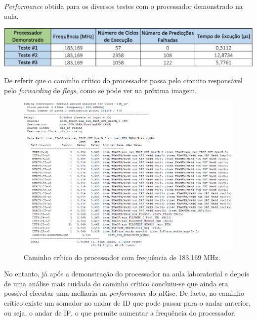 \documentclass[11pt]{article}
\numberwithin{equation}{section}
\begin{document}
\begin{table}[H]
	\centering
	\caption{\textit{Performance} obtida para os diversos testes com o processador demonstrado na aula.}
	\vspace{-1.5mm}
	\includegraphics[keepaspectratio=true, scale=0.40]{tabelas/processadororiginal}
	\label{tab:processadororiginal}
\end{table}

De referir que o caminho crítico do processador passa pelo circuito responsável pelo \textit{forwarding} de \textit{flags}, como se pode ver na próxima imagem.

\begin{figure}[H]
	\centering
	\includegraphics[keepaspectratio=true, scale=0.35]{imagens/freq183}
	\vspace{-0.5em}
	\caption{Caminho crítico do processador com frequência de 183,169 MHz.}
	\label{fig:183}
	\vspace{-0.8em}
\end{figure} 

No entanto, já após a demonstração do processador na aula laboratorial e depois de uma análise mais cuidada do caminho crítico concluiu-se que ainda era possível efecutar uma melhoria na \textit{performance} do $\mu$Risc. De facto, no caminho crítico existe um somador no andar de ID que pode passar para o andar anterior, ou seja, o andar de IF, o que permite aumentar a frequência do processador. 
\end{document}
